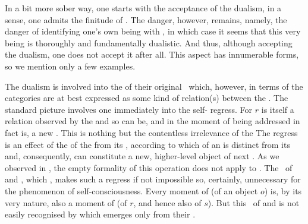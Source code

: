 \pa\label{pa:equrel}
In a bit more sober way, one starts with the acceptance of the
 dualism, in a sense, one admits the finitude of
. The danger, however, remains, namely, the danger of identifying
one's own being with , in which case it seems that this very being
is thoroughly and fundamentally dualistic. And thus, although accepting the
 dualism, one does not accept it after all. This aspect has
innumerable forms, so we mention only a few examples. 

%
The dualism is involved into the
 of their original \nexus\ which, however, in terms of the
 categories are at best expressed as some kind of relation(s)
between the . The standard picture
%
%
involves one immediately into the self- regress. For $r$ is
itself a relation observed by the  and so can be, and in the moment
of being addressed in fact is, a new . This is nothing but the
contentless irrelevance of the 
%
The regress is an effect of the  of the 
from its , according to which  of an  
is distinct from its  and, consequently, can constitute a new,
higher-level object of next . As we observed in
, the empty formality of this operation does not apply 
to . 
The \equin\ of  and , which 
, makes such a regress if not impossible so, certainly,
unnecessary for the phenomenon of self-consciousness. Every moment of
 (of an object $o$) is, by its very nature, also a moment of  (of $r$, and hence also of $s$). But this \equin\ of
 and  is 
not easily recognised by  which emerges only from their
.

